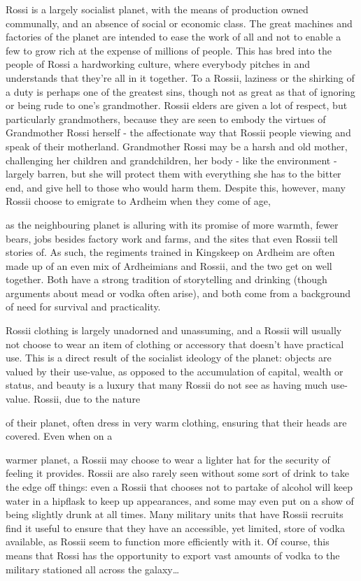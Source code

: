 Rossi is a largely socialist planet, with the means of production owned communally, and an absence of social or economic class. The great machines and factories of the planet are intended to ease the work of all and not to enable a few to grow rich at the expense of millions of people. This has bred into the people of Rossi a hardworking culture, where everybody pitches in and understands that they're all in it together. To a Rossii, laziness or the shirking of a duty is perhaps one of the greatest sins, though not as great as that of ignoring or being rude to one's grandmother. Rossii elders are given a lot of respect, but particularly grandmothers, because they are seen to embody the virtues of Grandmother Rossi herself - the affectionate way that Rossii people viewing and speak of their motherland. Grandmother Rossi may be a harsh and old mother, challenging her children and grandchildren, her body - like the environment - largely barren, but she will protect them with everything she has to the bitter end, and give hell to those who would harm them. Despite this, however, many Rossii choose to emigrate to Ardheim when they come of age,

as the neighbouring planet is alluring with its promise of more warmth, fewer bears, jobs besides factory work and farms, and the sites that even Rossii tell stories of. As such, the regiments trained in Kingskeep on Ardheim are often made up of an even mix of Ardheimians and Rossii, and the two get on well together. Both have a strong tradition of storytelling and drinking (though arguments about mead or vodka often arise), and both come from a background of need for survival and practicality.

Rossii clothing is largely unadorned and unassuming, and a Rossii will usually not choose to wear an item of clothing or accessory that doesn't have practical use. This is a direct result of the socialist ideology of the planet: objects are valued by their use-value, as opposed to the accumulation of capital, wealth or status, and beauty is a luxury that many Rossii do not see as having much use-value. Rossii, due to the nature

of their planet, often dress in very warm clothing, ensuring that their heads are covered. Even when on a

warmer planet, a Rossii may choose to wear a lighter hat for the security of feeling it provides. Rossii are also rarely seen without some sort of drink to take the edge off things: even a Rossii that chooses not to partake of alcohol will keep water in a hipflask to keep up appearances, and some may even put on a show of being slightly drunk at all times. Many military units that have Rossii recruits find it useful to ensure that they have an accessible, yet limited, store of vodka available, as Rossii seem to function more efficiently with it. Of course, this means that Rossi has the opportunity to export vast amounts of vodka to the military stationed all across the galaxy{\dots}

